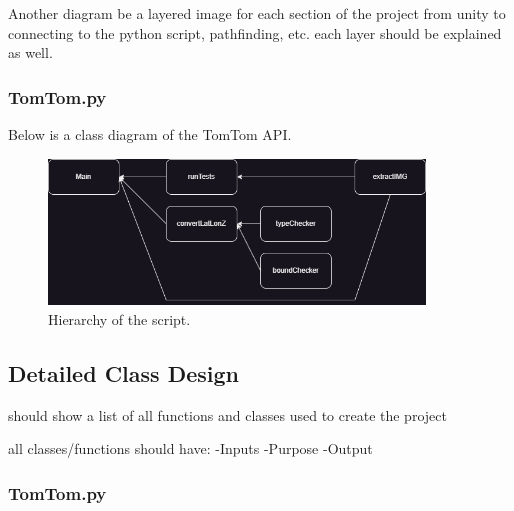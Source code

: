 Another diagram be a layered image for each section of the project from unity to connecting to the python script, pathfinding, etc. each layer should be explained as well.

\subsubsection{TomTom.py}

Below is a class diagram of the TomTom API.

\begin{figure}[htb]
    \centering
    \includegraphics[width=10cm]{Images/TomTomHier.png}
       \caption{Hierarchy of the script.}
           \label{Fig:TomTomHier}
\end{figure}

\subsection{Detailed Class Design}

should show a list of all functions and classes used to create the project

all classes/functions should have:
-Inputs
-Purpose
-Output

\subsubsection{TomTom.py}

